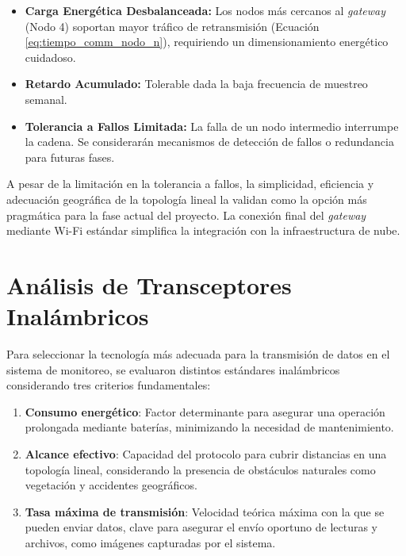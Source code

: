 \begin{itemize}
    \item \textbf{Carga Energética Desbalanceada:} Los nodos más cercanos al \textit{gateway} (Nodo 4) soportan mayor tráfico de retransmisión (Ecuación \eqref{eq:tiempo_comm_nodo_n}), requiriendo un dimensionamiento energético cuidadoso.
    \item \textbf{Retardo Acumulado:} Tolerable dada la baja frecuencia de muestreo semanal.
    \item \textbf{Tolerancia a Fallos Limitada:} La falla de un nodo intermedio interrumpe la cadena. Se considerarán mecanismos de detección de fallos o redundancia para futuras fases.
\end{itemize}

A pesar de la limitación en la tolerancia a fallos, la simplicidad, eficiencia y adecuación geográfica de la topología lineal la validan como la opción más pragmática para la fase actual del proyecto. La conexión final del \textit{gateway} mediante Wi-Fi estándar simplifica la integración con la infraestructura de nube.




\section{Análisis de Transceptores Inalámbricos}
\label{sec:analisis_tecnologias}

Para seleccionar la tecnología más adecuada para la transmisión de datos en el sistema de monitoreo, se evaluaron distintos estándares inalámbricos considerando tres criterios fundamentales:

\begin{enumerate}
    \item \textbf{Consumo energético}: Factor determinante para asegurar una operación prolongada mediante baterías, minimizando la necesidad de mantenimiento.
    \item \textbf{Alcance efectivo}: Capacidad del protocolo para cubrir distancias en una topología lineal, considerando la presencia de obstáculos naturales como vegetación y accidentes geográficos.
    \item \textbf{Tasa máxima de transmisión}: Velocidad teórica máxima con la que se pueden enviar datos, clave para asegurar el envío oportuno de lecturas y archivos, como imágenes capturadas por el sistema.
\end{enumerate}

